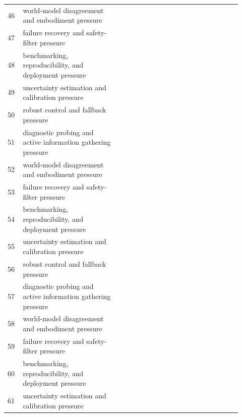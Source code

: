 \documentclass[11pt]{article}
\begin{document}
\begin{longtable}{p{0.06\linewidth}p{0.38\linewidth}p{0.48\linewidth}}
46 & world-model disagreement and embodiment pressure & \citep{guazzelli1998affordances136,shanahan1996noise137,kohler2024predictive138} \\
47 & failure recovery and safety-filter pressure & \citep{bradley2025e008139,ren2025analyzing140,arcones2026embedded141} \\
48 & benchmarking, reproducibility, and deployment pressure & \citep{chen2026virtualdocumentaugmented142,shin2026deep143,sun2026realworld144} \\
49 & uncertainty estimation and calibration pressure & \citep{yu2023visuallyprompted145,maulion2022risk146,hu2025define147} \\
50 & robust control and fallback pressure & \citep{galanakis2023the148,wainer2000testlet149,wideqvist2021hospital150} \\
51 & diagnostic probing and active information gathering pressure & \citep{kudoh2011vitroid151,pearl2013linear152,moon2019comparison153} \\
52 & world-model disagreement and embodiment pressure & \citep{kim2022bimbased154,tasse2022world155,li2022dnswin156} \\
53 & failure recovery and safety-filter pressure & \citep{manrai2026navigating157,haruna2023generalized158,wei2014the159} \\
54 & benchmarking, reproducibility, and deployment pressure & \citep{pamecha2002a160,orchard2005a161,ref2021on162} \\
55 & uncertainty estimation and calibration pressure & \citep{ding2022learning163,komari2020side164,frick2025lessonslearnt165} \\
56 & robust control and fallback pressure & \citep{liu2003evaluation166,iglesias2023data167,ma2024accurate168} \\
57 & diagnostic probing and active information gathering pressure & \citep{hummel2024a169,joseph2021towards170,sarker2021machine171} \\
58 & world-model disagreement and embodiment pressure & \citep{dulacarnold2021challenges172,kumaresan2026acar173,jamal2020tourism174} \\
59 & failure recovery and safety-filter pressure & \citep{dalgaty2024mosaic175,qin2017a176,liu2022roles177} \\
60 & benchmarking, reproducibility, and deployment pressure & \citep{rodina2024nonfunctional178,yin2024effective179,cooperrider2024a180} \\
61 & uncertainty estimation and calibration pressure & \citep{ahn2022do181,montagna2023causal182,briat2023noise183} \\

\end{longtable}
\end{document}
